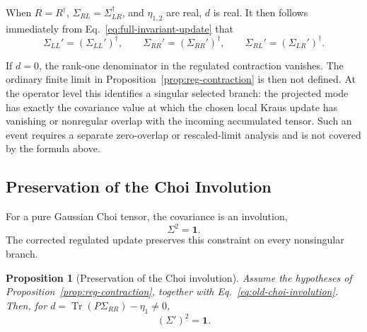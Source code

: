 \documentclass[aps,prb,onecolumn,nofootinbib,superscriptaddress]{revtex4-2}
\newcommand{\I}{\mathbf{1}}
\newcommand{\Tr}{\operatorname{Tr}}
\theoremstyle{plain}
\newtheorem{proposition}{Proposition}
\theoremstyle{definition}
\begin{document}
When \(R=R^\dagger\), \(\Sigma_{RL}=\Sigma_{LR}^{\dagger}\), and
\(\eta_{1,2}\) are real, \(d\) is real.  It then follows immediately from
Eq.~\eqref{eq:full-invariant-update} that
\begin{equation}
  \Sigma_{LL}'=(\Sigma_{LL}')^\dagger,
  \qquad
  \Sigma_{RR}'=(\Sigma_{RR}')^\dagger,
  \qquad
  \Sigma_{RL}'=(\Sigma_{LR}')^\dagger.
  \label{eq:hermiticity-preservation}
\end{equation}

If \(d=0\), the rank-one denominator in the regulated contraction vanishes.
The ordinary finite limit in Proposition~\ref{prop:reg-contraction} is then
not defined.  At the operator level this identifies a singular selected
branch: the projected mode has exactly the covariance value at which the
chosen local Kraus update has vanishing or nonregular overlap with the
incoming accumulated tensor.  Such an event requires a separate
zero-overlap or rescaled-limit analysis and is not covered by the formula
above.

\subsection{Preservation of the Choi Involution}

For a pure Gaussian Choi tensor, the covariance is an involution,
\begin{equation}
  \Sigma^2=\I.
  \label{eq:old-choi-involution}
\end{equation}
The corrected regulated update preserves this constraint on every
nonsingular branch.

\begin{proposition}[Preservation of the Choi involution]
  Assume the hypotheses of Proposition~\ref{prop:reg-contraction}, together
  with Eq.~\eqref{eq:old-choi-involution}.  Then, for
  \(d=\Tr(P\Sigma_{RR})-\eta_1\neq0\),
  \begin{equation}
    \left(\Sigma'\right)^2=\I.
    \label{eq:new-choi-involution}
  \end{equation}
\end{proposition}
\end{document}
